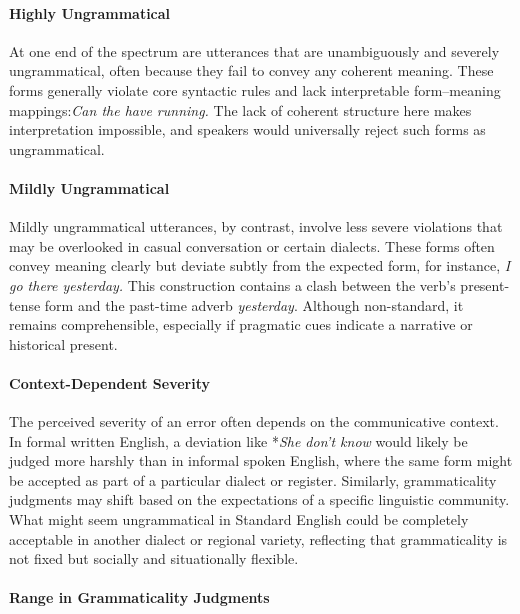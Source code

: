 \paragraph*{Highly Ungrammatical}

At one end of the spectrum are utterances that are unambiguously and severely ungrammatical, often because they fail to convey any coherent meaning. These forms generally violate core syntactic rules and lack interpretable form–meaning mappings:\textit{Can the have running.} The lack of coherent structure here makes interpretation impossible, and speakers would universally reject such forms as ungrammatical.

\paragraph*{Mildly Ungrammatical}

Mildly ungrammatical utterances, by contrast, involve less severe violations that may be overlooked in casual conversation or certain dialects. These forms often convey meaning clearly but deviate subtly from the expected form, for instance, \textit{I go there yesterday.} This construction contains a clash between the verb's present-tense form and the past-time adverb \textit{yesterday}. Although non-standard, it remains comprehensible, especially if pragmatic cues indicate a narrative or historical present.

\paragraph*{Context-Dependent Severity}

The perceived severity of an error often depends on the communicative context. In formal written English, a deviation like *\textit{She don't know} would likely be judged more harshly than in informal spoken English, where the same form might be accepted as part of a particular dialect or register. Similarly, grammaticality judgments may shift based on the expectations of a specific linguistic community. What might seem ungrammatical in Standard English could be completely acceptable in another dialect or regional variety, reflecting that grammaticality is not fixed but socially and situationally flexible.

\paragraph*{Range in Grammaticality Judgments}

